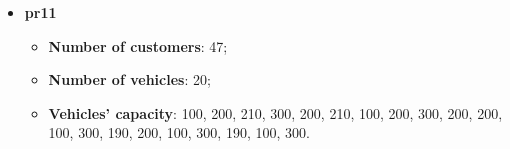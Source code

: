\documentclass[../main.tex]{subfiles}
\begin{document}
\begin{itemize}
    \item \textbf{pr11}
        \begin{itemize}
            \item \textbf{Number of customers}: 47;
            \item \textbf{Number of vehicles}: 20;
            \item \textbf{Vehicles' capacity}: 100, 200, 210, 300, 200, 210, 100, 200, 300, 200, 200, 100, 300, 190, 200, 100, 300, 190, 100, 300.
        \end{itemize}

\end{itemize}
\end{document}
